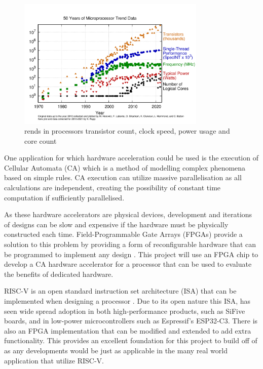 \begin{figure}[h]
	\centering
	\includegraphics[width=0.8\textwidth]{50-years-processor-trend.png}
	\caption{rends in processors transistor count, clock speed, power usage and core count \cite{PROCTREND}}
	\label{fig:PROCTREND}
\end{figure}

One application for which hardware acceleration could be used is the execution of Cellular Automata (CA) which is a method of modelling complex phenomena based on simple rules. CA execution can utilize massive parallelisation as all calculations are independent, creating the possibility of constant time computation if sufficiently parallelised.

As these hardware accelerators are physical devices, development and iterations of designs can be slow and expensive if the hardware must be physically constructed each time. Field\mbox{-}Programmable Gate Arrays (FPGAs) provide a solution to this problem by providing a form of reconfigurable hardware that can be programmed to implement any design \cite{WHATISFPGA}. This project will use an FPGA chip to develop a CA hardware accelerator for a processor that can be used to evaluate the benefits of dedicated hardware.

RISC\mbox{-}V is an open standard instruction set architecture (ISA) that can be implemented when designing a processor \cite{RISCV}. Due to its open nature this ISA, has seen wide spread adoption in both high\mbox{-}performance products, such as SiFive boards, and in low\mbox{-}power microcontrollers such as Espressif’s ESP32\mbox{-}C3. There is also an FPGA implementation \cite{Asanović:EECS-2016-17} that can be modified and extended to add extra functionality. This provides an excellent foundation for this project to build off of as any developments would be just as applicable in the many real world application that utilize RISC\mbox{-}V.

